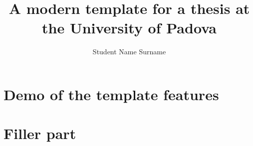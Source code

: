 \documentclass[%
]{unipd-thesis-modern} %
\title{A modern template for a thesis at\\ the University of Padova}
\author{Student Name Surname}
\begin{document}
    \frontmatter

    \mainmatter

    
    \glsresetall  %


    \part{\label{prt:demo}Demo of the template features} %

    


    \part{\label{prt:filler}Filler part}
    
    


    

    \begin{appendices}
        
    \end{appendices}

    \backmatter
\end{document}
